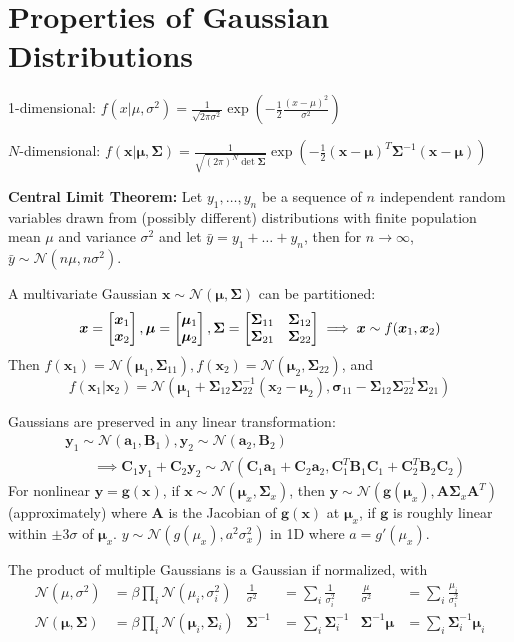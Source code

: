 \documentclass[twocolumn, 8pt]{extarticle}
\begin{document}
\section{Properties of Gaussian Distributions} %

1-dimensional: $\displaystyle f(x|\mu, \sigma^2) = \frac{1}{\sqrt{2\pi\sigma^2}}\exp\left(-\frac{1}{2}\frac{(x - \mu)^2}{\sigma^2}\right)$

$N$-dimensional: $\displaystyle f(\bm x | \bm\mu, \bm \Sigma) = \frac{1}{\sqrt{(2\pi)^N\det\bm \Sigma}}\exp\left(-\frac{1}{2}(\bm x - \bm\mu)^T\bm \Sigma^{-1}(\bm x - \bm\mu)\right)$

\textbf{Central Limit Theorem:} Let $y_1, \dots, y_n$ be a sequence of $n$ independent random variables drawn from
(possibly different) distributions with finite population mean $\mu$ and variance $\sigma^2$ and let
$\bar y = y_1 + \dots + y_n$, then for $n \to \infty$, $\bar y \sim \mathcal N(n\mu, n\sigma^2)$.

A multivariate Gaussian $\bm x \sim \mathcal N(\bm\mu, \bm\Sigma)$ can be partitioned:
$$\bm x = \cvec{\bm x_1}{\bm x_2}, \bm\mu = \cvec{\bm\mu _1}{\bm\mu _2}, \bm\Sigma = \mattwo{\bm\Sigma _{11}}{\bm\Sigma _{12}}{\bm\Sigma _{21}}{\bm\Sigma _{22}} \implies \bm x \sim f(\bm x_1, \bm x_2)$$
Then $f(\bm x_1) = \mathcal N(\bm\mu _1, \bm\Sigma _{11}), f(\bm x_2) = \mathcal N(\bm\mu _2, \bm\Sigma _{22})$, and
$$f(\bm x_1 | \bm x_2) = \mathcal N(\bm\mu _1 + \bm\Sigma _{12}\bm\Sigma _{22}^{-1}(\bm x_2 - \bm\mu _2), \bm\sigma _{11} - \bm\Sigma _{12}\bm\Sigma _{22}^{-1}\bm\Sigma _{21})$$

Gaussians are preserved in any linear transformation:
\begin{align*}
    &\bm y_1 \sim \mathcal N(\bm a_1, \bm B_1), \bm y_2 \sim \mathcal N(\bm a_2, \bm B_2) \\
    &\qquad\implies \bm C_1\bm y_1 + \bm C_2\bm y_2 \sim \mathcal N(\bm C_1\bm a_1 + \bm C_2\bm a_2, \bm C_1^T\bm B_1\bm C_1 + \bm C_2^T\bm B_2\bm C_2)
\end{align*}
For nonlinear $\bm y = \bm g(\bm x)$, if $\bm x \sim \mathcal N(\bm\mu _x, \bm\Sigma _x)$, then $\bm y \sim \mathcal N(\bm g(\bm\mu _x), \bm A\bm\Sigma _x\bm A^T)$
(approximately) where $\bm A$ is the Jacobian of $\bm g(\bm x)$ at $\bm\mu _x$, if $\bm g$ is roughly linear within
$\pm 3\sigma$ of $\bm\mu _x$. $y \sim \mathcal N(g(\mu _x), a^2\sigma _x^2)$ in 1D where $a = g'(\mu _x)$.

The product of multiple Gaussians is a Gaussian if normalized, with
\begin{align*}
    \mathcal N(\mu, \sigma^2) &= \beta \prod _i \mathcal N(\mu _i, \sigma _i^2)         & \frac{1}{\sigma^2} &= \sum _i \frac{1}{\sigma _i^2}  & \frac{\mu}{\sigma^2} &= \sum _i \frac{\mu _i}{\sigma _i^2} \\
    \mathcal N(\bm\mu, \bm\Sigma) &= \beta\prod _i \mathcal N(\bm\mu _i, \bm\Sigma _i)  & \bm\Sigma^{-1} &= \sum _i \bm\Sigma _i^{-1}          & \bm\Sigma^{-1}\bm\mu &= \sum _i \bm\Sigma _i^{-1}\bm\mu _i \\
\end{align*}
\end{document}

